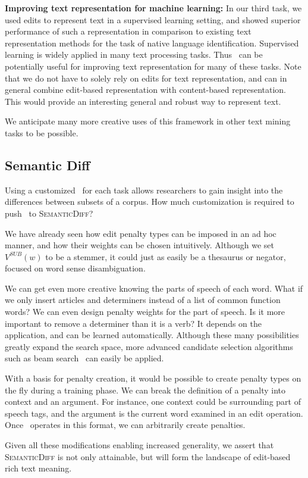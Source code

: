\noindent
{\bf Improving text representation for machine learning:} In our third task,
we used edits to represent text in a supervised learning setting, and showed
superior performance of such a representation in comparison to existing
text representation methods for the task of native language identification.
Supervised learning is widely applied in many text processing tasks. Thus
\sd~can be potentially useful for improving text representation for many of
these tasks. Note that we do not have to solely rely on edits for text
representation, and can in general combine edit-based representation with
content-based representation. This would provide an interesting general and
robust way to represent text.

We anticipate many more creative uses of this framework in other
text mining tasks to be possible.

\subsection{Semantic Diff}

Using a customized \sd~for each task allows researchers to gain insight into
the differences between subsets of a corpus. How much customization is required
to push \sd~to \textsc{SemanticDiff}?

We have already seen how edit penalty types can be imposed in an ad hoc manner,
and how their weights can be chosen intuitively. Although we set $V^{SUB}(w)$
to be a stemmer, it could just as easily be a thesaurus or negator, focused on
word sense disambiguation.

We can get even more creative knowing the parts of speech of each word. What if
we only insert articles and determiners instead of a list of common function
words? We can even design penalty weights for the part of speech. Is it more
important to remove a determiner than it is a verb? It depends on the
application, and can be learned automatically. Although these many possibilities
greatly expand the search space, more advanced candidate selection algorithms
such as beam search~\cite{ai} can easily be applied.

With a basis for penalty creation, it would be possible to create penalty types
on the fly during a training phase. We can break the definition of a penalty
into context and an argument. For instance, one context could be surrounding
part of speech tags, and the argument is the current word examined in an edit
operation. Once \sd~operates in this format, we can arbitrarily create
penalties.

Given all these modifications enabling increased generality, we assert that
\textsc{SemanticDiff} is not only attainable, but will form the landscape of
edit-based rich text meaning.
